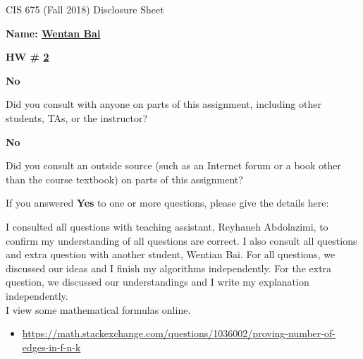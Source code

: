 \documentclass[12pt]{article}
\newcommand*\circled[1]{\tikz[baseline=(char.base)]{
            \node[shape=circle,draw,inner sep=2pt] (char) {#1};}}
\begin{document}
\begin{center}
  \Large
  CIS 675 (Fall 2018) Disclosure Sheet 
\end{center} 
\vspace*{2em}

\noindent
\textbf{\Large Name: \underline{ Wentan Bai }} 


\noindent 
\begin{minipage}[t]{1.0\linewidth}

\begin{minipage}[t]{0.25\linewidth}
\textbf{\Large
  HW \# \underline{ 2 }
} 

\end{minipage} \vspace*{3ex}




\begin{minipage}[t]{.8in}
  \textbf{\circled{Yes} \quad No}
\end{minipage}
\qquad 
\begin{minipage}[t]{5.5in}
  Did you consult with anyone on parts of this assignment, including other students, TAs, or the instructor? 
\end{minipage}
\vspace*{1ex}

\begin{minipage}[t]{.8in}
  \textbf{\circled{Yes} \quad No}
\end{minipage}
\qquad 
\begin{minipage}[t]{5.5in}
  Did you consult an outside source (such as an Internet forum or a
  book other than the course textbook) on parts of this assignment? 
\end{minipage}
\vspace*{1ex}

\noindent
  If you answered \textbf{Yes} to one or more questions, please give the details here: \vspace*{5ex} \par
  I consulted all questions with teaching assistant, Reyhaneh Abdolazimi, to confirm my understanding of all questions are correct. 
  I also consult all questions and extra question with another student, Wentian Bai. For all questions, we discussed our ideas and I finish my algorithms independently. 
  For the extra question, we discussed our understandings and I write my explanation independently.  \vspace*{5ex} \\

  I view some mathematical formulas online.
  \begin{itemize}
    \item \href{url}{https://math.stackexchange.com/questions/1036002/proving-number-of-edges-in-f-n-k} 
   
  \end{itemize}

\vfill
\end{minipage}
\end{document}

